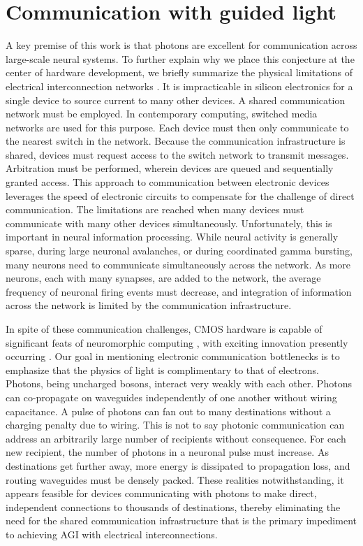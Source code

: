 \documentclass[twocolumn]{article}
\begin{document}
\section{\label{sec:communication}Communication with guided light}
A key premise of this work is that photons are excellent for communication across large-scale neural systems. To further explain why we place this conjecture at the center of hardware development, we briefly summarize the physical limitations of electrical interconnection networks \cite{hepa2012}. It is impracticable in silicon electronics for a single device to source current to many other devices. A shared communication network must be employed. In contemporary computing, switched media networks are used for this purpose. Each device must then only communicate to the nearest switch in the network. Because the communication infrastructure is shared, devices must request access to the switch network to transmit messages. Arbitration must be performed, wherein devices are queued and sequentially granted access. This approach to communication between electronic devices leverages the speed of electronic circuits to compensate for the challenge of direct communication. The limitations are reached when many devices must communicate with many other devices simultaneously. Unfortunately, this is important in neural information processing. While neural activity is generally sparse, during large neuronal avalanches, or during coordinated gamma bursting, many neurons need to communicate simultaneously across the network. As more neurons, each with many synapses, are added to the network, the average frequency of neuronal firing events must decrease, and integration of information across the network is limited by the communication infrastructure.

In spite of these communication challenges, CMOS hardware is capable of significant feats of neuromorphic computing \cite{bo2000,pfgr2013,mear2014,fuga2014,payu2017}, with exciting innovation presently occurring \cite{dasr2018}. Our goal in mentioning electronic communication bottlenecks is to emphasize that the physics of light is complimentary to that of electrons. Photons, being uncharged bosons, interact very weakly with each other. Photons can co-propagate on waveguides independently of one another without wiring capacitance. A pulse of photons can fan out to many destinations without a charging penalty due to wiring. This is not to say photonic communication can address an arbitrarily large number of recipients without consequence. For each new recipient, the number of photons in a neuronal pulse must increase. As destinations get further away, more energy is dissipated to propagation loss, and routing waveguides must be densely packed. These realities notwithstanding, it appears feasible for devices communicating with photons to make direct, independent connections to thousands of destinations, thereby eliminating the need for the shared communication infrastructure that is the primary impediment to achieving AGI with electrical interconnections.
\end{document}
